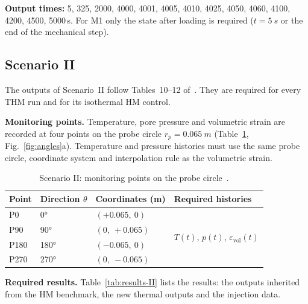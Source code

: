 \documentclass[11pt,a4paper]{article}
\begin{document}
\textbf{Output times:} 5, 325, 2000, 4000, 4001, 4005, 4010, 4025, 4050, 4060,
4100, 4200, 4500, 5000\,s. For M1 only the state after loading is required
($t=\SI{5}{s}$ or the end of the mechanical step).

\subsection{Scenario II}
\label{sec:outputs-II}
The outputs of Scenario~II follow Tables~10--12 of~\cite{Pan2026}. They are
required for every THM run and for its isothermal HM control.

\textbf{Monitoring points.} Temperature, pore pressure and volumetric strain are
recorded at four points on the probe circle $r_p=\SI{0.065}{m}$
(Table~\ref{tab:points-II}, Fig.~\ref{fig:angles}a). Temperature and pressure
histories must use the same probe circle, coordinate system and interpolation
rule as the volumetric strain.

\begin{table}[htbp]
\centering
\caption{Scenario II: monitoring points on the probe circle~\cite{Pan2026}.}
\label{tab:points-II}
\small
\begin{tabular}{@{}llll@{}}
\toprule
Point & Direction $\theta$ & Coordinates (m) & Required histories \\
\midrule
P0   & \ang{0}   & $(+0.065,\ 0)$ & \multirow{4}{*}{$T(t)$, $p(t)$, $\varepsilon_\mathrm{vol}(t)$} \\
P90  & \ang{90}  & $(0,\ +0.065)$ & \\
P180 & \ang{180} & $(-0.065,\ 0)$ & \\
P270 & \ang{270} & $(0,\ -0.065)$ & \\
\bottomrule
\end{tabular}
\end{table}

\textbf{Required results.} Table~\ref{tab:results-II} lists the results: the
outputs inherited from the HM benchmark, the new thermal outputs and the
injection data.
\end{document}
